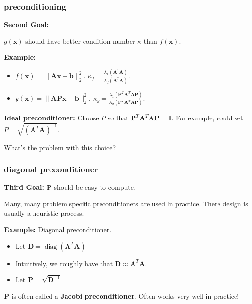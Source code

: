 \documentclass[compress]{beamer}
\newcommand{\bv}[1]{\mathbf{#1}}
\DeclareMathOperator{\diag}{diag}
\begin{document}
\begin{frame}[t]
	\frametitle{preconditioning}
	\textbf{Second Goal:} 
	
	$g(\bv{x})$ should have better condition number $\kappa$ than $f(\bv{x})$. 
	
	\textbf{Example:} 
	\begin{itemize}
		\item $f(\bv{x}) = \|\bv{A}\bv{x} - \bv{b}\|_2^2$. $\kappa_f =\frac{\lambda_1(\bv{A}^T\bv{A})}{\lambda_d(\bv{A}^T\bv{A})}$.
		\item $g(\bv{x}) = \|\bv{A}\bv{P}\bv{x} - \bv{b}\|_2^2$. $\kappa_g =\frac{\lambda_1(\bv{P}^T\bv{A}^T\bv{A}\bv{P})}{\lambda_d(\bv{P}^T\bv{A}^T\bv{A}\bv{P})}$.
	\end{itemize}
	
	\textbf{Ideal preconditioner:} Choose $P$ so that  $\bv{P}^T\bv{A}^T\bv{A}\bv{P} = \bv{I}$. For example, could set $P = \sqrt{(\bv{A}^T\bv{A})^{-1}}$.
	
	\begin{center}
		\alert{What's the problem with this choice?}
	\end{center}
\end{frame}

\begin{frame}[t]
	\frametitle{diagonal preconditioner}
	\textbf{Third Goal:} $\bv{P}$ should be easy to compute. 
	
	\begin{center}
		\alert{Many, many problem specific preconditioners are used in practice. There design is usually a heuristic process.} 
	\end{center}
	
	\textbf{Example:} Diagonal preconditioner. 
	\begin{itemize}
		\item Let $\bv{D} = \diag(\bv{A}^T\bv{A})$
		\item Intuitively, we roughly have that $\bv{D} \approx \bv{A}^T\bv{A}$. 
		\item Let $\bv{P} = \sqrt{\bv{D}^{-1}}$
	\end{itemize}
	$\bv{P}$ is often called a \alert{\textbf{Jacobi preconditioner}}. Often works very well in practice!
\end{frame}
\end{document}
